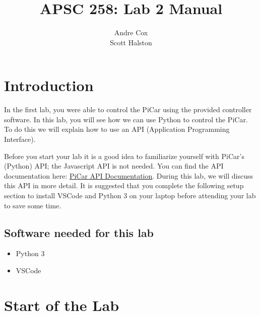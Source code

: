 \documentclass[11pt]{report}
\title{APSC 258: Lab 2 Manual}
\author{Andre Cox \\ Scott Halston}
\begin{document}
\maketitle
\tableofcontents

\clearpage

\chapter{Introduction}
In the first lab, you were able to control the PiCar using the provided controller software. In this lab, you will see how we can use Python to control the PiCar. To do this we will explain how to use an API (Application Programming Interface).


Before you start your lab it is a good idea to familiarize yourself with PiCar's (Python) API; the Javascript API is not needed. You can find the API documentation here:
\href{https://github.com/PiCarV/Car-Software/wiki/Pi-Car-V-API-Documentation}{PiCar
    API Documentation}. During this lab, we will discuss this API in more detail. It is suggested that you complete the following setup section to install VSCode and Python 3 on your laptop before attending your lab to save some time.

\section{Software needed for this lab}
\begin{itemize}
    \item Python 3
    \item VSCode   
\end{itemize}

\chapter{Start of the Lab}
\end{document}
